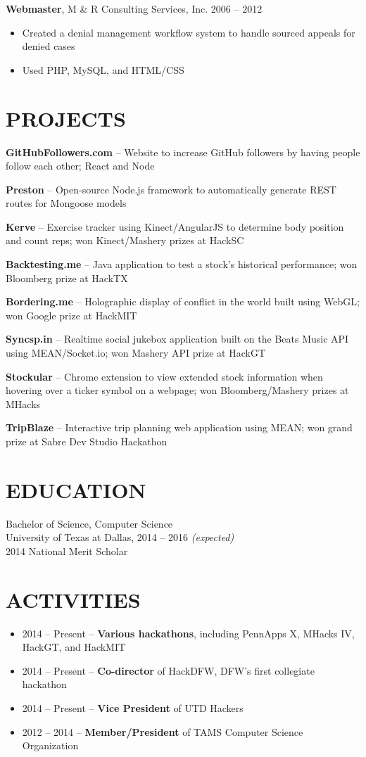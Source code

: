 \documentclass{res} %
\begin{document}
{\bf Webmaster}, M \& R Consulting Services, Inc. \hfill 2006 -- 2012
\begin{itemize} \itemsep -2pt
  \item Created a denial management workflow system to handle sourced appeals for denied cases
  \item Used PHP, MySQL, and HTML/CSS
\end{itemize} 

\section{PROJECTS}

\textbf{GitHubFollowers.com} -- Website to increase GitHub followers by having people follow each other; React and Node

\textbf{Preston} -- Open-source Node.js framework to automatically generate REST routes for Mongoose models

\textbf{Kerve} -- Exercise tracker using Kinect/AngularJS to determine body position and count reps; won Kinect/Mashery prizes at HackSC

\textbf{Backtesting.me} -- Java application to test a stock's historical performance; won Bloomberg prize at HackTX

\textbf{Bordering.me} -- Holographic display of conflict in the world built using WebGL; won Google prize at HackMIT

\textbf{Syncsp.in} -- Realtime social jukebox application built on the Beats Music API using MEAN/Socket.io; won Mashery API prize at HackGT

\textbf{Stockular} -- Chrome extension to view extended stock information when hovering over a ticker symbol on a webpage; won Bloomberg/Mashery prizes at MHacks

\textbf{TripBlaze} -- Interactive trip planning web application using MEAN; won grand prize at Sabre Dev Studio Hackathon

\section{EDUCATION}

Bachelor of Science, Computer Science \\
University of Texas at Dallas, 2014 -- 2016 \textit {(expected)} \\
2014 National Merit Scholar

\section{ACTIVITIES} 

\begin{itemize} \itemsep -2pt
  \item 2014 -- Present -- \textbf{Various hackathons}, including PennApps X, MHacks IV, HackGT, and HackMIT
  \item 2014 -- Present -- \textbf{Co-director} of HackDFW, DFW's first collegiate hackathon
  \item 2014 -- Present -- \textbf{Vice President} of UTD Hackers
  \item 2012 -- 2014 -- \textbf{Member/President} of TAMS Computer Science Organization
\end{itemize}
\end{document}
